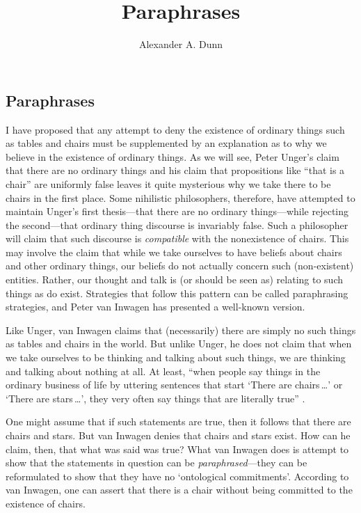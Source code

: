 \documentclass[11pt]{article}
\title{Paraphrases}
\author{Alexander A. Dunn}
\begin{document}
\ifstandalone
\maketitle
\begin{spacing}{1.5}
\fi

\section{Paraphrases}
\label{van-paraphrase}
I have proposed that any attempt to deny the existence of ordinary
things such as tables and chairs must be supplemented by an
explanation as to why we believe in the existence of ordinary things.
As we will see, Peter Unger's claim that there are no ordinary things
and his claim that propositions like ``that is a chair'' are uniformly
false leaves it quite mysterious why we take there to be chairs in the
first place.  Some nihilistic philosophers, therefore, have attempted
to maintain Unger's first thesis---that there are no ordinary
things---while rejecting the second---that ordinary thing discourse is
invariably false.  Such a philosopher will claim that such discourse
is {\em compatible} with the nonexistence of chairs.  This may involve
the claim that while we take ourselves to have beliefs about chairs
and other ordinary things, our beliefs do not actually concern such
(non-existent) entities.  Rather, our thought and talk is (or should
be seen as) relating to such things as do exist.  Strategies that
follow this pattern can be called paraphrasing strategies, and Peter
van Inwagen has presented a well-known version.

Like Unger, van Inwagen claims that (necessarily) there are simply no
such things as tables and chairs in the world.  But unlike Unger, he
does not claim that when we take ourselves to be thinking and talking
about such things, we are thinking and talking about nothing at all.
At least, ``when people say things in the ordinary business of life by
uttering sentences that start `There are chairs\,\ldots ' or `There
are stars\,\ldots ', they very often say things that are literally
true'' \citep[102]{inwagen1995}.  

One might assume that if such statements are true, then it follows
that there are chairs and stars.  But van Inwagen denies that chairs
and stars exist.  How can he claim, then, that what was said was true?
What van Inwagen does is attempt to show that the statements in
question can be {\em paraphrased}---they can be reformulated to show
that they have no `ontological commitments'.  According to van
Inwagen, one can assert that there is a chair without being committed
to the existence of chairs.


\end{spacing}
\end{document}

